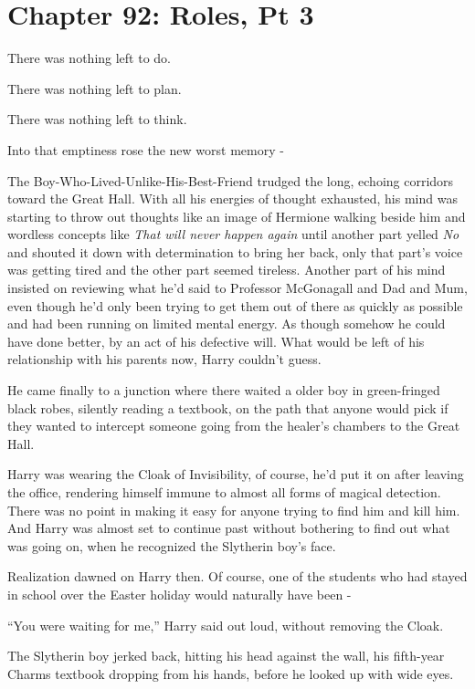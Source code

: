 \chapter{Chapter 92: Roles, Pt 3}
There was nothing left to do.

There was nothing left to plan.

There was nothing left to think.

Into that emptiness rose the new worst memory -

The Boy-Who-Lived-Unlike-His-Best-Friend trudged the long, echoing
corridors toward the Great Hall. With all his energies of thought
exhausted, his mind was starting to throw out thoughts like an image of
Hermione walking beside him and wordless concepts like \emph{That will
never happen again} until another part yelled \emph{No} and shouted it
down with determination to bring her back, only that part's voice was
getting tired and the other part seemed tireless. Another part of his
mind insisted on reviewing what he'd said to Professor McGonagall and
Dad and Mum, even though he'd only been trying to get them out of there
as quickly as possible and had been running on limited mental energy. As
though somehow he could have done better, by an act of his defective
will. What would be left of his relationship with his parents now, Harry
couldn't guess.

He came finally to a junction where there waited a older boy in
green-fringed black robes, silently reading a textbook, on the path that
anyone would pick if they wanted to intercept someone going from the
healer's chambers to the Great Hall.

Harry was wearing the Cloak of Invisibility, of course, he'd put it on
after leaving the office, rendering himself immune to almost all forms
of magical detection. There was no point in making it easy for anyone
trying to find him and kill him. And Harry was almost set to continue
past without bothering to find out what was going on, when he recognized
the Slytherin boy's face.

Realization dawned on Harry then. Of course, one of the students who had
stayed in school over the Easter holiday would naturally have been -

``You were waiting for me,'' Harry said out loud, without removing the
Cloak.

The Slytherin boy jerked back, hitting his head against the wall, his
fifth-year Charms textbook dropping from his hands, before he looked up
with wide eyes.

